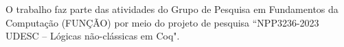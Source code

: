 O trabalho faz parte das atividades do Grupo de Pesquisa em Fundamentos da Computação (FUNÇÃO) por meio do projeto de pesquisa ``NPP3236-2023 UDESC -- Lógicas não-clássicas em Coq".